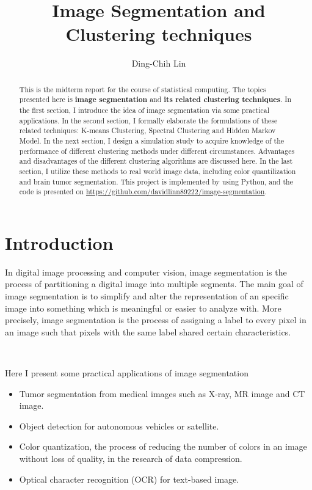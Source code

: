 \documentclass[a4paper]{article}
\title{Image Segmentation and Clustering techniques}
\author{Ding-Chih Lin}
\begin{document}
\maketitle

\begin{abstract}
This is the midterm report for the course of statistical computing. The topics presented here is \textbf{image segmentation} and \textbf{its related clustering techniques}. In the first section, I introduce the idea of image segmentation via some practical applications. In the second section, I formally elaborate the formulations of these related techniques: K-means Clustering,  Spectral Clustering and Hidden Markov Model. In the next section, I design a simulation study to acquire knowledge of the performance of different clustering methods under different circumstances. Advantages and disadvantages of the different clustering algorithms are discussed here. In the last section, I utilize these methods to real world image data, including color quantilization and brain tumor segmentation. This project is implemented by using Python, and the code is presented on \url{https://github.com/davidlinn89222/image-segmentation}.

\end{abstract}


\section{Introduction}

In digital image processing and computer vision, image segmentation is the process of partitioning a digital image into multiple segments. The main goal of image segmentation is to simplify and alter the representation of an specific image into something which is meaningful or easier to analyze with. More precisely, image segmentation is the process of assigning a label to every pixel in an image such that pixels with the same label shared certain characteristics.


\

Here I present some practical applications of image segmentation
\begin{itemize}
	\item Tumor segmentation from medical images such as  X-ray, MR image and CT image.
	\item Object detection for autonomous vehicles or satellite.
	\item Color quantization, the process of reducing the number of colors in an image without loss of quality, in the research of data compression.
	\item Optical character recognition (OCR) for text-based image.
\end{itemize}
\end{document}
